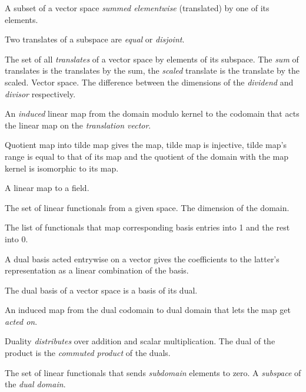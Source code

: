 \begin{multicols}{3}
  A subset of a vector space \textit{summed elementwise} (translated) by one of its elements.

  Two translates of a subspace are \textit{equal} or \textit{disjoint}.

  The set of all \textit{translates} of a vector space by elements of its subspace.
  The \textit{sum} of translates is the translates by the sum, the \textit{scaled} translate
  is the translate by the scaled.
   Vector space.
  The difference between the dimensions of the \textit{dividend} and \textit{divisor} respectively.

  An \textit{induced} linear map from the domain modulo kernel to the codomain that
  acts the linear map on the \textit{translation vector}.
  
  Quotient map into tilde map gives the map, tilde map is injective,
  tilde map's range is equal to that of its map and
  the quotient of the domain with the map kernel is isomorphic
  to its map.


  A linear map to a field.

  The set of linear functionals from a given space.
  The dimension of the domain.

  The list of functionals that map corresponding basis entries
  into 1 and the rest into 0.

  A dual basis acted entrywise on a vector gives the coefficients
  to the latter's representation as a linear combination of the basis.

  The dual basis of a vector space is a basis of its dual.

  An induced map from the dual codomain to dual domain
  that lets the map get \textit{acted on}.

  Duality \textit{distributes} over addition and scalar multiplication.
  The dual of the product is the \textit{commuted product} of the duals.

  The set of linear functionals that sends \textit{subdomain} elements to zero.
   A \textit{subspace} of the \textit{dual domain}.


\end{multicols}
